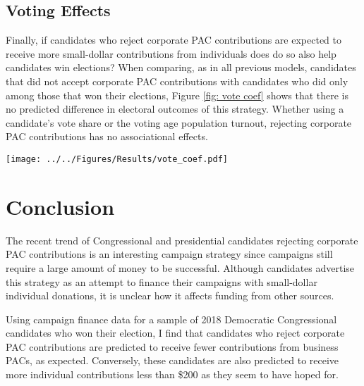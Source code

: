 \documentclass[12pt]{article}
\begin{document}
\subsection{Voting Effects}

Finally, if candidates who reject corporate PAC contributions are expected to receive more small-dollar contributions from individuals does do so also help candidates win elections? When comparing, as in all previous models, candidates that did not accept corporate PAC contributions with candidates who did only among those that won their elections, Figure \ref{fig: vote coef} shows that there is no predicted difference in electoral outcomes of this strategy. Whether using a candidate's vote share or the voting age population turnout, rejecting corporate PAC contributions has no associational effects. 

\begin{figure*}[!htb]
    \center
    \texttt{[image: ../../Figures/Results/vote\_coef.pdf]}
    \caption{\textbf{The Effect of Rejecting Corporate PAC Contributions on Vote Share and Turnout.} These figures present the posterior distributions estimated for a candidate that pledges to reject corporate PAC contributions. The dot shows the median coefficient estimate, and the intervals show the 50\% and 89\% highest density intervals. This figure shows that rejecting corporate PAC contributions does not affect a candidate's vote percentage or turnout. See Table \ref{tbl: vote results} for the formal estimates.}
    \label{fig: vote coef}
\end{figure*}


\section{Conclusion} \label{sec: conclusion}

The recent trend of Congressional and presidential candidates rejecting corporate PAC contributions is an interesting campaign strategy since campaigns still require a large amount of money to be successful. Although candidates advertise this strategy as an attempt to finance their campaigns with small-dollar individual donations, it is unclear how it affects funding from other sources. 

Using campaign finance data for a sample of 2018 Democratic Congressional candidates who won their election, I find that candidates who reject corporate PAC contributions are predicted to receive fewer contributions from business PACs, as expected. Conversely, these candidates are also predicted to receive more individual contributions less than \$200 as they seem to have hoped for. 
\end{document}
